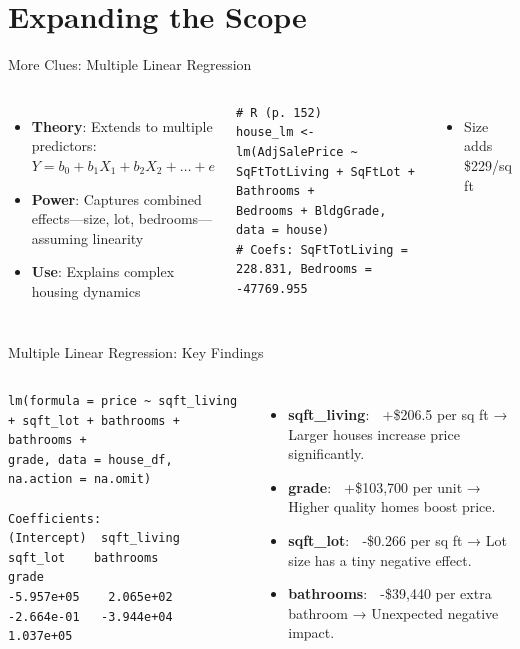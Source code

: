 \documentclass{beamer}
\begin{document}
	
	\section{Expanding the Scope}
	
	\begin{frame}[fragile]{More Clues: Multiple Linear Regression}
		\begin{columns}
			\begin{itemize}
				\item \textbf{Theory}: Extends to multiple predictors: $Y = b_0 + b_1X_1 + b_2X_2 + \dots + e$
				\item \textbf{Power}: Captures combined effects—size, lot, bedrooms—assuming linearity
				\item \textbf{Use}: Explains complex housing dynamics
			\end{itemize}
			\begin{lstlisting}
# R (p. 152)
house_lm <- lm(AdjSalePrice ~ SqFtTotLiving + SqFtLot + Bathrooms +
Bedrooms + BldgGrade, data = house)
# Coefs: SqFtTotLiving = 228.831, Bedrooms = -47769.955
			\end{lstlisting}
			\begin{itemize}
				\item Size adds \$229/sq ft
			\end{itemize}
		\end{columns}
	\end{frame}
	


\begin{frame}[fragile]{Multiple Linear Regression: Key Findings}
	\begin{columns}
		\column{0.9\textwidth}
		\begin{lstlisting}
lm(formula = price ~ sqft_living + sqft_lot + bathrooms + bathrooms + 
grade, data = house_df, na.action = na.omit)

Coefficients:
(Intercept)  sqft_living     sqft_lot    bathrooms        grade  
-5.957e+05    2.065e+02   -2.664e-01   -3.944e+04    1.037e+05  
		\end{lstlisting}
		\begin{itemize}
			\item \textbf{sqft\_living}: 🏡 +\$206.5 per sq ft → Larger houses increase price significantly.
			\item \textbf{grade}: 🔼 +\$103,700 per unit → Higher quality homes boost price.
			\item \textbf{sqft\_lot}: 🌲 -\$0.266 per sq ft → Lot size has a tiny negative effect.
			\item \textbf{bathrooms}: 🚿 -\$39,440 per extra bathroom → Unexpected negative impact.
		\end{itemize}
	\end{columns}
\end{frame}
\end{document}
